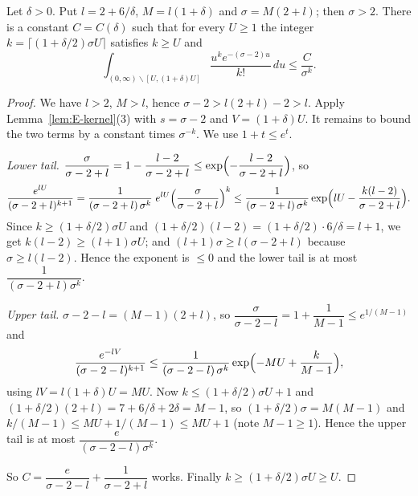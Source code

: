 \begin{lemma}\label{lem:E-tails}

\par{}\par
Let $\delta>0$. Put $l=2+6/\delta$, $M=l(1+\delta)$ and $\sigma=M(2+l)$; then $\sigma>2$. There is a
constant $C=C(\delta)$ such that for every $U\ge1$ the integer
$k=\lceil(1+\delta/2)\sigma U\rceil$ satisfies $k\ge U$ and
\[
\int_{(0,\infty)\smallsetminus[U,(1+\delta)U]}\frac{u^{k}e^{-(\sigma-2)u}}{k!}\,du\le\frac{C}{\sigma^{k}} .
\]
\end{lemma}
\begin{proof}
We have $l>2$, $M>l$, hence $\sigma-2>l(2+l)-2>l$. Apply Lemma~\ref{lem:E-kernel}(3) with
$s=\sigma-2$ and $V=(1+\delta)U$. It remains to bound the two terms by a constant times
$\sigma^{-k}$. We use $1+t\le e^{t}$.

\emph{Lower tail.} $\dfrac{\sigma}{\sigma-2+l}=1-\dfrac{l-2}{\sigma-2+l}\le
\exp\Bigl(-\dfrac{l-2}{\sigma-2+l}\Bigr)$, so
\[
\frac{e^{lU}}{(\sigma-2+l)^{k+1}}=\frac{1}{(\sigma-2+l)\,\sigma^{k}}\;e^{lU}
\Bigl(\frac{\sigma}{\sigma-2+l}\Bigr)^{k}\le
\frac{1}{(\sigma-2+l)\,\sigma^{k}}\exp\Bigl(lU-\frac{k(l-2)}{\sigma-2+l}\Bigr).
\]
Since $k\ge(1+\delta/2)\sigma U$ and $(1+\delta/2)(l-2)=(1+\delta/2)\cdot6/\delta=l+1$, we get
$k(l-2)\ge(l+1)\sigma U$; and $(l+1)\sigma\ge l(\sigma-2+l)$ because $\sigma\ge l(l-2)$. Hence the
exponent is $\le0$ and the lower tail is at most $\dfrac{1}{(\sigma-2+l)\sigma^{k}}$.

\emph{Upper tail.} $\sigma-2-l=(M-1)(2+l)$, so
$\dfrac{\sigma}{\sigma-2-l}=1+\dfrac{1}{M-1}\le e^{1/(M-1)}$ and
\[
\frac{e^{-lV}}{(\sigma-2-l)^{k+1}}\le\frac{1}{(\sigma-2-l)\,\sigma^{k}}
\exp\Bigl(-MU+\frac{k}{M-1}\Bigr),
\]
using $lV=l(1+\delta)U=MU$. Now $k\le(1+\delta/2)\sigma U+1$ and
$(1+\delta/2)(2+l)=7+6/\delta+2\delta=M-1$, so $(1+\delta/2)\sigma=M(M-1)$ and
$k/(M-1)\le MU+1/(M-1)\le MU+1$ (note $M-1\ge1$). Hence the upper tail is at most
$\dfrac{e}{(\sigma-2-l)\sigma^{k}}$.

So $C=\dfrac{e}{\sigma-2-l}+\dfrac{1}{\sigma-2+l}$ works. Finally
$k\ge(1+\delta/2)\sigma U\ge U$.

\end{proof}

